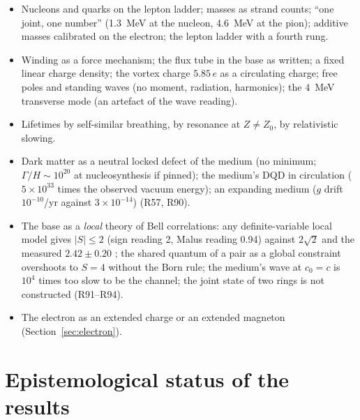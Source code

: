 \documentclass[11pt,a4paper]{article}
\theoremstyle{plain}
\theoremstyle{remark}
\begin{document}
\begin{itemize}[nosep]
\item Nucleons and quarks on the lepton ladder; masses as strand counts; ``one joint, one number''
(1.3~MeV at the nucleon, 4.6~MeV at the pion); additive masses calibrated on the electron; the
lepton ladder with a fourth rung.
\item Winding as a force mechanism; the flux tube in the base as written; a fixed linear charge
density; the vortex charge $5.85\,e$ as a circulating charge; free poles and standing waves (no
moment, radiation, harmonics); the $4$~MeV transverse mode (an artefact of the wave reading).
\item Lifetimes by self-similar breathing, by resonance at $Z \ne Z_0$, by relativistic slowing.
\item Dark matter as a neutral locked defect of the medium (no minimum; $\Gamma/H \sim 10^{20}$ at
nucleosynthesis if pinned); the medium's DQD in circulation ($5\times10^{33}$ times the observed
vacuum energy); an expanding medium ($g$ drift $10^{-10}$/yr against $3\times10^{-14}$) (R57, R90).
\item The base as a \emph{local} theory of Bell correlations: any definite-variable local model
gives $|S| \le 2$ (sign reading 2, Malus reading 0.94) against $2\sqrt2$ and the measured
$2.42 \pm 0.20$ \cite{hensen}; the shared quantum of a pair as a global constraint overshoots to
$S = 4$ without the Born rule; the medium's wave at $c_0 = c$ is $10^4$ times too slow to be the
channel; the joint state of two rings is not constructed (R91--R94).
\item The electron as an extended charge or an extended magneton (Section~\ref{sec:electron}).
\end{itemize}

\section{Epistemological status of the results}\label{sec:status}
\end{document}
